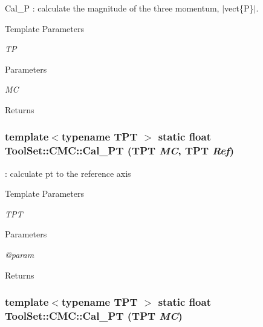 Cal\_\-P : calculate the magnitude of the three momentum, $|$vect\{P\}$|$. 
\begin{DoxyTemplParams}{Template Parameters}
\item[{\em TP}]\end{DoxyTemplParams}

\begin{DoxyParams}{Parameters}
\item[{\em MC}]\end{DoxyParams}
\begin{DoxyReturn}{Returns}

\end{DoxyReturn}
\hypertarget{classToolSet_1_1CMC_a8c4c04395c95a6c513f049029c157a7d}{
\subsubsection[{Cal\_\-PT}]{\setlength{\rightskip}{0pt plus 5cm}template$<$typename TPT $>$ static float ToolSet::CMC::Cal\_\-PT (TPT {\em MC}, \/  TPT {\em Ref})}}
\label{classToolSet_1_1CMC_a8c4c04395c95a6c513f049029c157a7d}


: calculate pt to the reference axis 
\begin{DoxyTemplParams}{Template Parameters}
\item[{\em TPT}]\end{DoxyTemplParams}

\begin{DoxyParams}{Parameters}
\item[{\em @param}]\end{DoxyParams}
\begin{DoxyReturn}{Returns}

\end{DoxyReturn}
\hypertarget{classToolSet_1_1CMC_ac479ce63e1328c284ef104449b30d465}{
\subsubsection[{Cal\_\-PT}]{\setlength{\rightskip}{0pt plus 5cm}template$<$typename TPT $>$ static float ToolSet::CMC::Cal\_\-PT (TPT {\em MC})}}
\label{classToolSet_1_1CMC_ac479ce63e1328c284ef104449b30d465}



